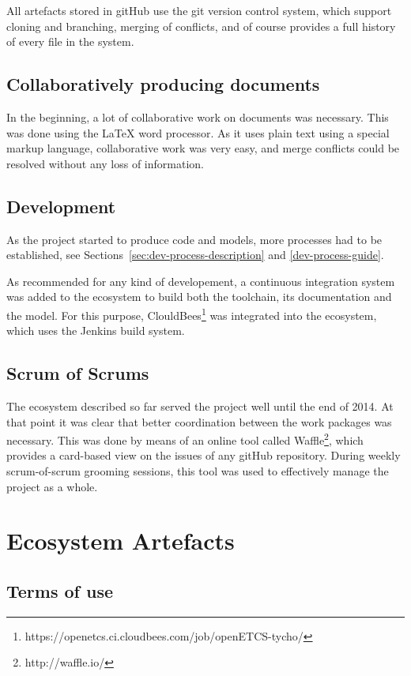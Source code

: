 \documentclass{template/openetcs_report}
\begin{document}
All artefacts stored in gitHub use the git version control system, which support cloning and branching, merging of conflicts, and of course provides a full history of every file in the system.

\section{Collaboratively producing documents}

In the beginning, a lot of collaborative work on documents was necessary. This was done using the \LaTeX{} word processor.  As it uses plain text using a special markup language, collaborative work was very easy, and merge conflicts could be resolved without any loss of information.

\section{Development}

As the project started to produce code and models, more processes had to be established, see Sections~\ref{sec:dev-process-description} and \ref{dev-process-guide}.

As recommended for any kind of developement, a continuous integration system was added to the ecosystem to build both the toolchain, its documentation and the model. For this purpose, ClouldBees\footnote{https://openetcs.ci.cloudbees.com/job/openETCS-tycho/} was integrated into the ecosystem, which uses the Jenkins build system.

\section{Scrum of Scrums}

The ecosystem described so far served the project well until the end of 2014. At that point it was clear that better coordination between the work packages was necessary. This was done by means of an online tool called Waffle\footnote{http://waffle.io/}, which provides a card-based view on the issues of any gitHub repository. During weekly scrum-of-scrum grooming sessions, this tool was used to effectively manage the project as a whole.

\chapter{Ecosystem Artefacts}


\section{Terms of use}
\label{sec:terms-of-use}
\end{document}
